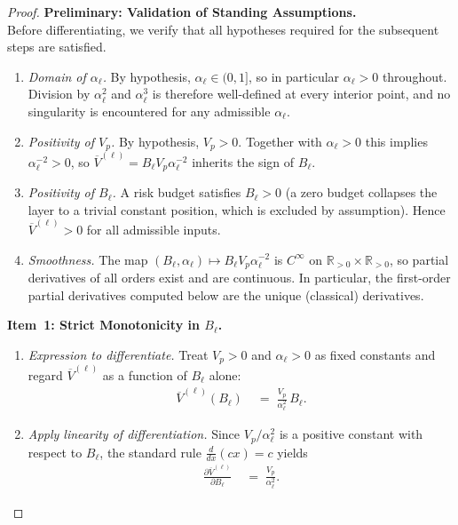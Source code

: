 \documentclass[12pt,openany]{book}
\numberwithin{equation}{chapter}
\theoremstyle{plain}
\theoremstyle{definition}
\theoremstyle{remark}
\begin{document}
\begin{proof}
\noindent\textbf{Preliminary: Validation of Standing Assumptions.}\\
Before differentiating, we verify that all hypotheses required
for the subsequent steps are satisfied.
\begin{enumerate}
  \item \emph{Domain of $\alpha_\ell$.}
        By hypothesis, $\alpha_\ell \in (0,1]$, so in particular
        $\alpha_\ell > 0$ throughout.  Division by $\alpha_\ell^2$
        and $\alpha_\ell^3$ is therefore well-defined at every
        interior point, and no singularity is encountered for any
        admissible $\alpha_\ell$.

  \item \emph{Positivity of $V_p$.}
        By hypothesis, $V_p > 0$.  Together with $\alpha_\ell > 0$
        this implies $\alpha_\ell^{-2} > 0$, so
        $\overline{V}^{(\ell)} = B_\ell V_p \alpha_\ell^{-2}$
        inherits the sign of $B_\ell$.

  \item \emph{Positivity of $B_\ell$.}
        A risk budget satisfies $B_\ell > 0$ (a zero budget
        collapses the layer to a trivial constant position, which
        is excluded by assumption).  Hence
        $\overline{V}^{(\ell)} > 0$ for all admissible inputs.

  \item \emph{Smoothness.}
        The map
        $(B_\ell, \alpha_\ell) \mapsto B_\ell V_p \alpha_\ell^{-2}$
        is $C^\infty$ on $\mathbb{R}_{>0} \times \mathbb{R}_{>0}$,
        so partial derivatives of all orders exist and are
        continuous.  In particular, the first-order partial
        derivatives computed below are the unique (classical)
        derivatives.
\end{enumerate}

\noindent\textbf{Item~1: Strict Monotonicity in $B_\ell$.}
\begin{enumerate}
  \item[\textit{Step 1.1.}] \emph{Expression to differentiate.}
        Treat $V_p > 0$ and $\alpha_\ell > 0$ as fixed constants
        and regard $\overline{V}^{(\ell)}$ as a function of
        $B_\ell$ alone:
        \begin{align}
          \overline{V}^{(\ell)}(B_\ell)
          &\;=\; \frac{V_p}{\alpha_\ell^2}\, B_\ell.
        \end{align}

  \item[\textit{Step 1.2.}] \emph{Apply linearity of
        differentiation.}
        Since $V_p / \alpha_\ell^2$ is a positive constant with
        respect to $B_\ell$, the standard rule
        $\frac{d}{dx}(cx) = c$ yields
        \begin{align}
          \frac{\partial \overline{V}^{(\ell)}}{\partial B_\ell}
          &\;=\; \frac{V_p}{\alpha_\ell^2}.
          \label{eq:sens-B-deriv}
        \end{align}


\end{enumerate}
\end{proof}
\end{document}
